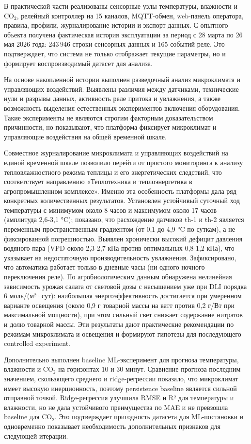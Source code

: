 \documentclass[a4paper,14pt]{extarticle}
\renewcommand{\texttt}[1]{\textnormal{#1}}
\begin{document}
В практической части реализованы сенсорные узлы температуры, влажности и
CO\(_2\), релейный контроллер на 15 каналов, MQTT-обмен, web-панель
оператора, правила, профили, журналирование истории и экспорт данных. С
опытного объекта получена фактическая история эксплуатации за период с
28 марта по 26 мая 2026 года: 243\,946 строки сенсорных данных и 165
событий реле. Это подтверждает, что система не только отображает текущие
параметры, но и формирует воспроизводимый датасет для анализа.

На основе накопленной истории выполнен разведочный анализ микроклимата и
управляющих воздействий. Выявлены различия между датчиками, технические
нули и разрывы данных, активность реле притока и увлажнения, а также
возможность выделения естественных экспериментов включения оборудования.
Такие эксперименты не являются строгим факторным доказательством
причинности, но показывают, что платформа фиксирует микроклимат и
управляющие воздействия на общей временной шкале.

Совместное журналирование микроклимата и управляющих воздействий на
единой временной шкале позволило перейти от простого мониторинга к
анализу тепловлажностного режима теплицы и его энергетических следствий,
что соответствует направлению «Теплотехника и теплоэнергетика в
агропромышленном комплексе». Именно эта особенность платформы дала ряд
конкретных количественных результатов. Установлен устойчивый суточный
ход температуры с минимумом около 8 часов и максимумом около 17 часов
(амплитуда 2,6-3,1 °C); показано, что расхождение датчиков \texttt{th-1}
и \texttt{th-2} является переменным пространственным градиентом (от 0,1
до 4,9 °C по суткам), а не фиксированной погрешностью. Выявлен
хронически высокий дефицит давления водяного пара (VPD около 2,3-2,7 кПа
против оптимальных 0,8-1,2 кПа), что указывает на недостаточную
производительность увлажнения. Зафиксировано, что автоматика работает
только в дневные часы (ни одного ночного переключения реле). По
агробиологическим данным обнаружена нелинейная зависимость урожая салата
от световой дозы с насыщением уже при DLI порядка 6 моль/(м²·сут):
наибольшая энергоэффективность достигается при умеренном варианте
освещения (около 0,9 г товарной массы на ватт против 0,2 г/Вт при
максимальной мощности), при этом сильный свет снижает содержание
нитратов и долю товарной массы. Эти результаты дают практические
рекомендации по режимам микроклимата и освещения и формируют гипотезы
для последующего controlled experiment.

Дополнительно выполнен baseline ML-эксперимент для прогноза температуры,
влажности и CO\(_2\) на горизонтах 10 и 30 минут. Сравнение прогноза
последним значением, скользящего среднего и ridge-регрессии показало,
что микроклимат имеет высокую инерционность, поэтому persistence
baseline является сильной отправной точкой. Ridge-регрессия улучшила
RMSE и R² для температуры и влажности, но не дала устойчивого
преимущества по MAE и не превзошла baseline для CO\(_2\). Это
подтверждает пригодность датасета для ML-постановки и одновременно
показывает необходимость дополнительных признаков для следующей
итерации.
\end{document}
